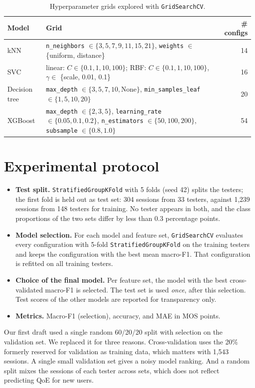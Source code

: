 \documentclass[11pt,a4paper]{article}
\newcommand{\code}[1]{\texttt{#1}}
\begin{document}
\begin{table}[ht]
  \centering\small
  \caption{Hyperparameter grids explored with \code{GridSearchCV}.}
  \label{tab:grids}
  \begin{tabular}{lp{11.5cm}r}
    \toprule
    Model & Grid & \# configs \\
    \midrule
    kNN & \code{n\_neighbors} $\in\{3,5,7,9,11,15,21\}$, \code{weights} $\in$ \{uniform, distance\} & 14 \\
    SVC & linear: $C\in\{0.1,1,10,100\}$; RBF: $C\in\{0.1,1,10,100\}$, $\gamma\in$ \{scale, 0.01, 0.1\} & 16 \\
    Decision tree & \code{max\_depth} $\in\{3,5,7,10,\text{None}\}$, \code{min\_samples\_leaf} $\in\{1,5,10,20\}$ & 20 \\
    XGBoost & \code{max\_depth} $\in\{2,3,5\}$, \code{learning\_rate} $\in\{0.05,0.1,0.2\}$,
              \code{n\_estimators} $\in\{50,100,200\}$, \code{subsample} $\in\{0.8,1.0\}$ & 54 \\
    \bottomrule
  \end{tabular}
\end{table}

\section{Experimental protocol}
\label{sec:protocol}
\begin{itemize}
  \item \textbf{Test split.} \code{StratifiedGroupKFold} with 5 folds (seed 42) splits the testers; the
        first fold is held out as test set: 304 sessions from 33 testers, against 1{,}239 sessions from 148
        testers for training. No tester appears in both, and the class proportions of the two sets differ
        by less than 0.3 percentage points.
  \item \textbf{Model selection.} For each model and feature set, \code{GridSearchCV} evaluates every
        configuration with 5-fold \code{StratifiedGroupKFold} on the training testers and keeps the
        configuration with the best mean macro-F1. That configuration is refitted on all training testers.
  \item \textbf{Choice of the final model.} Per feature set, the model with the best cross-validated
        macro-F1 is selected. The test set is used \emph{once}, after this selection. Test scores of the
        other models are reported for transparency only.
  \item \textbf{Metrics.} Macro-F1 (selection), accuracy, and MAE in MOS points.
\end{itemize}
\noindent
Our first draft used a single random 60/20/20 split with selection on the validation set. We replaced it
for three reasons. Cross-validation uses the 20\% formerly reserved for validation as training data, which
matters with 1{,}543 sessions. A single small validation set gives a noisy model ranking. And a random
split mixes the sessions of each tester across sets, which does not reflect predicting QoE for new users.
\end{document}
